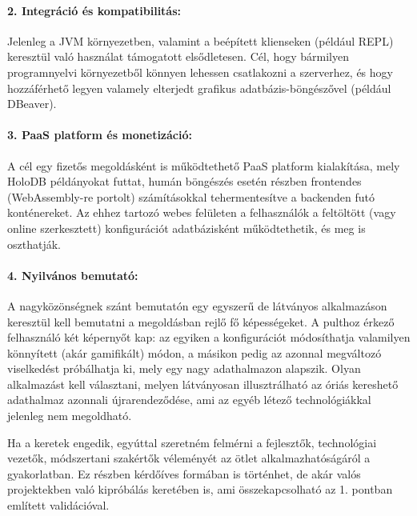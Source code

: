 \documentclass[12pt]{article}
\begin{document}
\paragraph{2. Integráció és kompatibilitás:}
Jelenleg a JVM környezetben, valamint a beépített klienseken (például REPL) keresztül való használat támogatott elsődletesen.
Cél, hogy bármilyen programnyelvi környezetből könnyen lehessen csatlakozni a szerverhez,
és hogy hozzáférhető legyen valamely elterjedt grafikus adatbázis-böngészővel (például DBeaver).

\paragraph{3. PaaS platform és monetizáció:}
A cél egy fizetős megoldásként is működtethető \mbox{PaaS} platform kialakítása,
mely HoloDB példányokat futtat,
humán böngészés esetén részben frontendes (WebAssembly-re portolt) számításokkal tehermentesítve a backenden futó konténereket.
Az ehhez tartozó webes felületen a felhasználók a feltöltött (vagy online szerkesztett)
konfigurációt adatbázisként működtethetik, és meg is oszthatják.

\paragraph{4. Nyilvános bemutató:}
A nagyközönségnek szánt bemutatón egy egyszerű de látványos alkalmazáson keresztül kell bemutatni a megoldásban rejlő fő képességeket.
A pulthoz érkező felhasználó két képernyőt kap:
az egyiken a konfigurációt módosíthatja valamilyen könnyített (akár gamifikált) módon,
a másikon pedig az azonnal megváltozó viselkedést próbálhatja ki, mely egy nagy adathalmazon alapszik.
Olyan alkalmazást kell választani, melyen látványosan illusztrálható az óriás kereshető adathalmaz azonnali újrarendeződése,
ami az egyéb létező technológiákkal jelenleg nem megoldható.

Ha a keretek engedik, egyúttal szeretném felmérni a fejlesztők, technológiai vezetők, módszertani szakértők véleményét az ötlet alkalmazhatóságáról a gyakorlatban.
Ez részben kérdőíves formában is történhet, de akár valós projektekben való kipróbálás keretében is, ami összekapcsolható az 1. pontban említett validációval.
\end{document}
